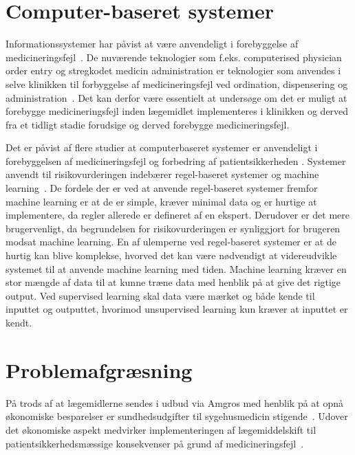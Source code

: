 \section{Computer-baseret systemer}
Informationssystemer har påvist at være anvendeligt i forebyggelse af medicineringsfejl~\citep{Agrawal2009, Anderson2002}. De nuværende teknologier som f.eks. computerised physician order entry og stregkodet medicin administration er teknologier som anvendes i selve klinikken til forbyggelse af medicineringsfejl ved ordination, dispensering og administration~\citep{Agrawal2009, Bates2000a, Kaushal2002, Stenner2010, Fischer2008, Simpson2008}. Det kan derfor være essentielt at undersøge om det er muligt at forebygge medicineringsfejl inden lægemidlet implementeres i klinikken og derved fra et tidligt stadie forudsige og derved forebygge medicineringsfejl. 

Det er påvist af flere studier at computerbaseret systemer er anvendeligt i forebyggelsen af medicineringsfejl og forbedring af patientsikkerheden \citep{Agrawal2009,}.
Systemer anvendt til risikovurderingen indebærer regel-baseret systemer og machine learning~\citep{Geissert2018,}. 
De fordele der er ved at anvende regel-baseret systemer fremfor machine learning er at de er simple, kræver minimal data og er hurtige at implementere, da regler allerede er defineret af en ekspert. Derudover er det mere brugervenligt, da begrundelsen  for risikovurderingen er synliggjort for brugeren modsat machine learning. En af ulemperne ved regel-baseret systemer er at de hurtig kan  blive komplekse, hvorved det kan være nødvendigt at videreudvikle systemet til at anvende machine learning med tiden. Machine learning kræver en stor mængde af data til at kunne træne data med henblik på at give det rigtige output. Ved supervised learning skal data være mærket og både kende til inputtet og outputtet, hvorimod unsupervised learning kun kræver at inputtet er kendt. 

\section{Problemafgræsning}
På trods af at lægemidlerne sendes i udbud via Amgros med henblik på at opnå økonomiske besparelser er sundhedsudgifter til sygehusmedicin stigende~\citep{Sundhed2016,Sygehusapoteket2017}. Udover det økonomiske aspekt medvirker implementeringen af lægemiddelskift til patientsikkerhedsmæssige konsekvenser på grund af medicineringsfejl~\citep{DanskSelskabforPatientsikkerhed2009,Hakonsen2010}. %

